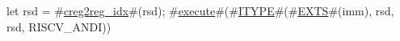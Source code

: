 let rsd = #\hyperref[sailRISCVzcreg2regzyidx]{creg2reg\_idx}#(rsd);
#\hyperref[sailRISCVzexecute]{execute}#(#\hyperref[sailRISCVzITYPE]{ITYPE}#(#\hyperref[sailRISCVzEXTS]{EXTS}#(imm), rsd, rsd, RISCV_ANDI))
